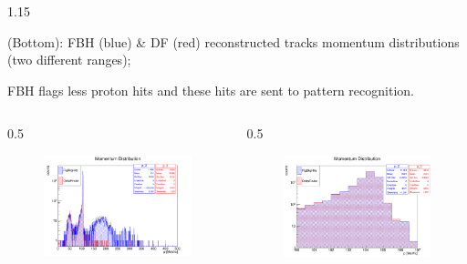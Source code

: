 \documentclass{beamer}
\begin{document}
\begin{frame}
    \vspace{-4mm}
 \begin{columns}
        \begin{column}{1.15\framewidth}
    \setlength{\leftmargini}{1.1em}
    \begin{itemize}
    {\footnotesize   
    \item (Bottom): FBH (blue) \& DF (red) reconstructed tracks momentum distributions (two different ranges);
    \item FBH flags less proton hits and these hits are sent to pattern recognition.
    }
    \end{itemize}
    \end{column}
    \end{columns}
        \vspace{-6mm}
     \begin{columns}
        \begin{column}{0.5\framewidth}
            \begin{figure}[!h]
        \centering
        \includegraphics[width =0.9\columnwidth]{figures/png/Screenshot_20240820_162125.png}
       \label{fig:momhits}
\end{figure}
        \end{column}
        \begin{column}{0.5\framewidth}
               \begin{figure}[!h]
        \centering
        \includegraphics[width =0.9\columnwidth]{figures/png/Screenshot_20240820_160904.png}

\end{figure}
\end{column}
\end{columns}
\end{frame}
\end{document}
